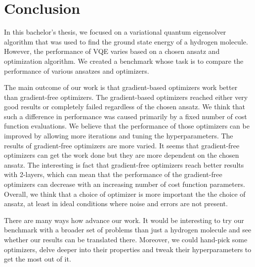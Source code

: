 \chapter*{Conclusion}


In this bachelor's thesis, we focused on a variational quantum eigensolver algorithm that was used to find the ground state energy of a hydrogen molecule. However, the performance of VQE varies based on a chosen ansatz and optimization algorithm. We created a benchmark whose task is to compare the performance of various ansatzes and optimizers.

The main outcome of our work is that gradient-based optimizers work better than gradient-free optimizers. The gradient-based optimizers reached either very good results or completely failed regardless of the chosen ansatz. We think that such a difference in performance was caused primarily by a fixed number of cost function evaluations. We believe that the performance of those optimizers can be improved by allowing more iterations and tuning the hyperparameters. The results of gradient-free optimizers are more varied. It seems that gradient-free optimizers can get the work done but they are more dependent on the chosen ansatz. The interesting is fact that gradient-free optimizers reach better results with 2-layers, which can mean that the performance of the gradient-free optimizers can decrease with an increasing number of cost function parameters. Overall, we think that a choice of optimizer is more important the the choice of ansatz, at least in ideal conditions where noise and errors are not present.

There are many ways how advance our work. It would be interesting to try our benchmark with a broader set of problems than just a hydrogen molecule and see whether our results can be translated there. Moreover, we could hand-pick some optimizers, delve deeper into their properties and tweak their hyperparameters to get the most out of it. 